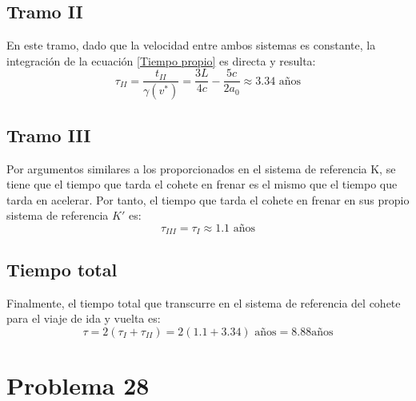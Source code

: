 \documentclass[11pt]{article}
\begin{document}
\subsection{Tramo II}
En este tramo, dado que la velocidad entre ambos sistemas es constante, la integración de la ecuación \eqref{Tiempo propio} es directa y resulta: 
\begin{equation}
    \tau_{II} = \dfrac{t_{II}}{\gamma(v^*)}=\dfrac{3L}{4c} - \dfrac{5c}{2a_0} \approx 3.34 \textrm{ años}
\end{equation}
\subsection{Tramo III}
Por argumentos similares a los proporcionados en el sistema de referencia K, se tiene que el tiempo que tarda el cohete en frenar es el mismo que el tiempo que tarda en acelerar. Por tanto, el tiempo que tarda el cohete en frenar en sus propio sistema de referencia $K'$ es:
\begin{equation}
    \tau_{III} = \tau_I \approx 1.1 \textrm{ años}
\end{equation}
\subsection{Tiempo total}
Finalmente, el tiempo total que transcurre en el sistema de referencia del cohete para el viaje de ida y vuelta es:
\begin{equation}
    \tau = 2(\tau_I + \tau_{II}) = 2(1.1 + 3.34) \textrm{ años} = 8.88 \textrm{años} 
\end{equation}
\section*{Problema 28}
\end{document}
